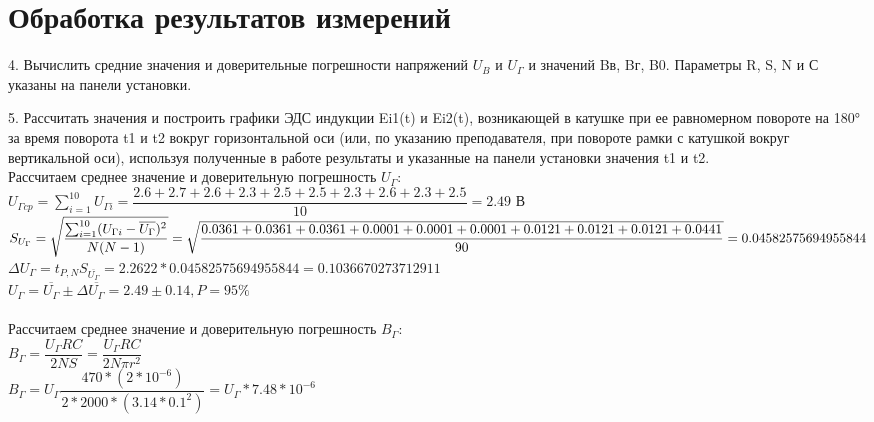 \section*{Обработка результатов измерений}

4. Вычислить средние значения и доверительные погрешности напряжений $U_B$ и $U_{\Gamma}$ и
значений Bв, Bг, B0. Параметры R, S, N и С указаны на панели установки.

5. Рассчитать значения и построить графики ЭДС индукции Ei1(t) и Ei2(t),
возникающей в катушке при ее равномерном повороте на 180° за время поворота t1 и t2
вокруг горизонтальной оси (или, по указанию преподавателя, при повороте рамки с
катушкой вокруг вертикальной оси), используя полученные в работе результаты и
указанные на панели установки значения t1 и t2. 
\ \\ 

Рассчитаем среднее значение и доверительную погрешность $ U_\Gamma $:\\

$ U_{\Gamma cp} = \sum_{i=1}^{10} U_{\Gamma i} = \dfrac{2.6 + 2.7 + 2.6 + 2.3 + 2.5 + 2.5 + 2.3 + 2.6 + 2.3 + 2.5}{10} = 2.49$ В
\\

$
S_{U_{\Gamma}} = \sqrt{
	\dfrac
	{
		\sum_{i=1}^{10}(U_{\Gamma i} - \overline{U_{\Gamma}})^2
	}
    {
    	N(N-1)
    }
} 
=\\
\sqrt{
	\dfrac
	{
		0.0361 + 0.0361 + 0.0361 + 0.0001 + 0.0001 + 0.0001 + 0.0121 + 0.0121 + 0.0121 + 0.0441
	}
	{
		90
	}
}
    = 
    \\0.04582575694955844
$
\\

$ \varDelta U_{\Gamma} = t_{P,N}S_{\overline{U_{\Gamma}}}
= 2.2622 * 0.04582575694955844 = 0.1036670273712911 $
\\

$ U_{\Gamma} = \overline{U_{\Gamma}} \pm \varDelta \overline{U_{\Gamma}} = 2.49 \pm 0.14 , P = 95\%$
\\

\ \\ 

Рассчитаем среднее значение и доверительную погрешность $ B_\Gamma $:\\

$ B_\Gamma = \dfrac{U_\Gamma RC}{2NS} = \dfrac{U_\Gamma RC}{2N\pi r^2} $
\\

$ B_\Gamma = U_\Gamma \dfrac{470 * (2 * 10^{-6})}{2 * 2000 * (3.14 * 0.1^2)} = U_\Gamma * 7.48 * 10^{-6} $


